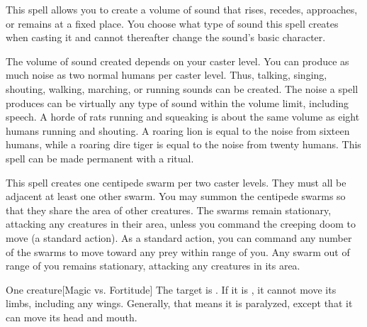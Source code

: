 \spellrng{\rngclose}
\spelldur{\durshort \dismissable}
\spellline
{}
\spelleffect This spell allows you to create a volume of sound that rises, recedes, approaches, or remains at a fixed place. You choose what type of sound this spell creates when casting it and cannot thereafter change the sound's basic character.
\par The volume of sound created depends on your caster level. You can produce as much noise as two normal humans per caster level. Thus, talking, singing, shouting, walking, marching, or running sounds can be created. The noise a  spell produces can be virtually any type of sound within the volume limit, including speech. A horde of rats running and squeaking is about the same volume as eight humans running and shouting. A roaring lion is equal to the noise from sixteen humans, while a roaring dire tiger is equal to the noise from twenty humans.
\spellnotes This spell can be made permanent with a  ritual.

\spellrng{\rngmed}
\spelldur{\durmed}
\spellline
\spelleffect This spell creates one centipede swarm per two caster levels. They must all be adjacent at least one other swarm. You may summon the centipede swarms so that they share the area of other creatures. The swarms remain stationary, attacking any creatures in their area, unless you command the creeping doom to move (a standard action). As a standard action, you can command any number of the swarms to move toward any prey within range of you. Any swarm out of range of you remains stationary, attacking any creatures in its area.

\spellrng{\rngmed}
\spelldur{\durshort}
\begin{spelltarget}{One creature}[Magic vs. Fortitude]
    \spellsuccess The target is \staggered. If it is \bloodied, it cannot move its limbs, including any wings. Generally, that means it is paralyzed, except that it can move its head and mouth.
\end{spelltarget}


